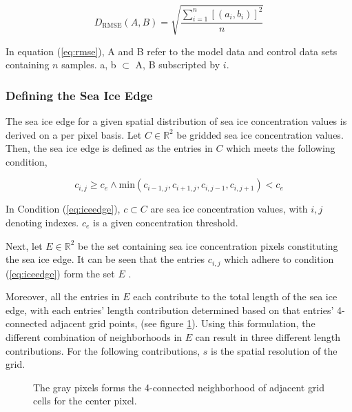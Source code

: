 \documentclass[../main/thesis.tex]{subfiles}
\begin{document}
\begin{equation}
    \label{eq:rmse}
    D_\text{RMSE}(A, B) = \sqrt{\frac{\sum_{i=1}^n\left[(a_i,b_i)\right]^2}{n}}
\end{equation}

In equation (\ref{eq:rmse}), A and B refer to the model data and control data sets containing $n$ samples. a, b $\subset$ A, B subscripted by $i$. 

\subsubsection{Defining the Sea Ice Edge}
\label{sec:iceedgelength}
The sea ice edge for a given spatial distribution of sea ice concentration values is derived on a per pixel basis. Let $C \in{\mathbb{R}^2}$ be gridded sea ice concentration values. Then, the sea ice edge is defined as the entries in $C$ which meets the following condition,

\begin{equation}
    \label{eq:iceedge}
    c_{i,j} \geq c_e \wedge \text{min}{(c_{i-1,j},c_{i+1,j},c_{i,j-1},c_{i,j+1})} < c_e
\end{equation}

In Condition (\ref{eq:iceedge}), $c \subset C$ are sea ice concentration values, with $i,j$ denoting indexes. $c_e$ is a given concentration threshold.

Next, let $E \in{\mathbb{R}^2}$ be the set containing sea ice concentration pixels constituting the sea ice edge. It can be seen that the entries $c_{i,j}$ which adhere to condition (\ref{eq:iceedge}) form the set $E$ \citep{Melsom2019}.

Moreover, all the entries in $E$ each contribute to the total length of the sea ice edge, with each entries' length contribution determined based on that entries' 4-connected adjacent grid points, (see figure \ref{fig:4-connection}). Using this formulation, the different combination of neighborhoods in $E$ can result in three different length contributions. For the following contributions, $s$ is the spatial resolution of the grid.

\begin{figure}
    \centering
    
    \caption{\label{fig:4-connection}The gray pixels forms the 4-connected neighborhood of adjacent grid cells for the center pixel.}
\end{figure}
\end{document}
